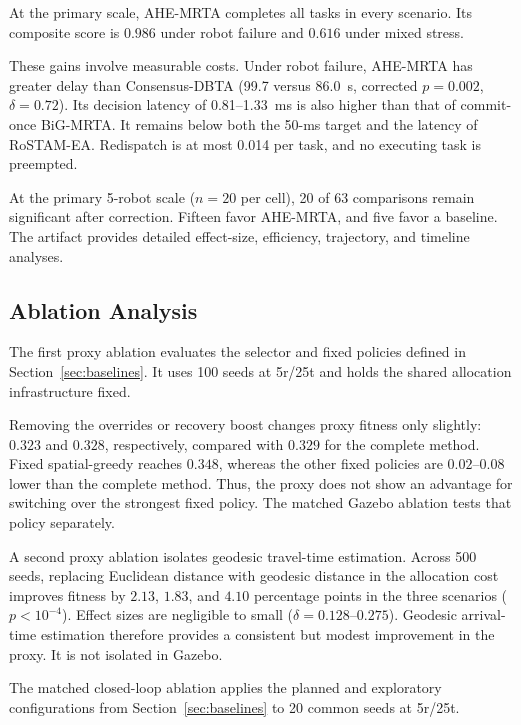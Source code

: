 \documentclass[10pt,letterpaper,onecolumn]{IEEEtran}
\begin{document}
At the primary scale, AHE-MRTA completes all tasks in every scenario. Its
composite score is $0.986$ under robot failure and $0.616$ under mixed stress.

These gains involve measurable costs. Under robot failure, AHE-MRTA has greater
delay than Consensus-DBTA (99.7 versus 86.0~s, corrected $p=0.002$,
$\delta=0.72$). Its decision latency of 0.81--1.33~ms is also higher than that
of commit-once BiG-MRTA. It remains below both the 50-ms target and the latency
of RoSTAM-EA. Redispatch is at most 0.014 per task, and no executing task is
preempted.

At the primary 5-robot scale ($n=20$ per cell), 20 of 63 comparisons remain
significant after correction. Fifteen favor AHE-MRTA, and five favor a
baseline. The artifact provides detailed effect-size, efficiency, trajectory,
and timeline analyses.

\subsection{Ablation Analysis}

\label{sec:ablation}
The first proxy ablation evaluates the selector and fixed policies defined in
Section~\ref{sec:baselines}. It uses 100 seeds at 5r/25t and holds the shared
allocation infrastructure fixed.



Removing the overrides or recovery boost changes proxy fitness only slightly:
$0.323$ and $0.328$, respectively, compared with $0.329$ for the complete
method. Fixed spatial-greedy reaches $0.348$, whereas the other fixed policies
are $0.02$--$0.08$ lower than the complete method. Thus, the proxy does not
show an advantage for switching over the strongest fixed policy. The matched
Gazebo ablation tests that policy separately.

A second proxy ablation isolates geodesic travel-time estimation. Across 500
seeds, replacing Euclidean distance with geodesic distance in the allocation
cost improves fitness by $2.13$, $1.83$, and $4.10$ percentage points in the
three scenarios ($p<10^{-4}$). Effect sizes are negligible to small
($\delta=0.128$--$0.275$). Geodesic arrival-time estimation therefore provides
a consistent but modest improvement in the proxy. It is not isolated in
Gazebo.

\label{sec:gazebo-ablation}
The matched closed-loop ablation applies the planned and exploratory
configurations from Section~\ref{sec:baselines} to 20 common seeds at 5r/25t.
\end{document}
